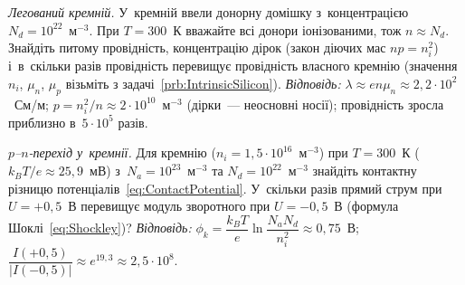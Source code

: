 \begin{problem}\label{prb:DopedSilicon}
	\emph{Легований кремній.} У~кремній ввели донорну домішку з~концентрацією
	$N_d=10^{22}$~м$^{-3}$. При $T=300$~К вважайте всі донори іонізованими, тож $n\approx
	N_d$. Знайдіть питому провідність, концентрацію дірок (закон діючих мас $np=n_i^2$)
	і~в~скільки разів провідність перевищує провідність власного кремнію (значення $n_i$,
	$\mu_n$, $\mu_p$ візьміть з задачі~\ref{prb:IntrinsicSilicon}). \emph{Відповідь:}
	$\lambda\approx en\mu_n\approx2{,}2\cdot10^{2}$~См/м;
	$p=n_i^2/n\approx2\cdot10^{10}$~м$^{-3}$ (дірки~--- неосновні носії); провідність
	зросла приблизно в~$5\cdot10^{5}$ разів.
\end{problem}

\begin{problem}\label{prb:PNJunction}
	\emph{$p$--$n$-перехід у~кремнії.} Для кремнію ($n_i=1{,}5\cdot10^{16}$~м$^{-3}$) при
	$T=300$~К ($k_BT/e\approx25{,}9$~мВ) з~$N_a=10^{23}$~м$^{-3}$ та
	$N_d=10^{22}$~м$^{-3}$ знайдіть контактну різницю
	потенціалів~\eqref{eq:ContactPotential}. У~скільки разів прямий струм при $U=+0{,}5$~В
	перевищує модуль зворотного при $U=-0{,}5$~В (формула Шоклі~\eqref{eq:Shockley})?
	\emph{Відповідь:} $\phi_k=\dfrac{k_BT}{e}\ln\dfrac{N_aN_d}{n_i^2}\approx0{,}75$~В;
	$\dfrac{I(+0{,}5)}{|I(-0{,}5)|}\approx e^{19{,}3}\approx2{,}5\cdot10^{8}$.
\end{problem}

